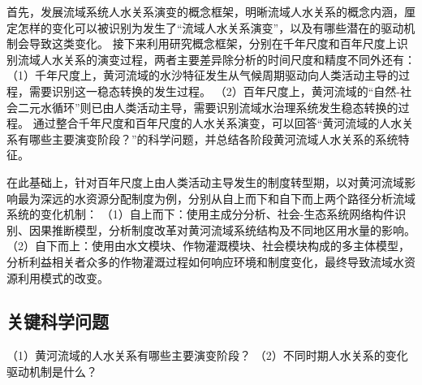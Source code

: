 首先，发展流域系统人水关系演变的概念框架，明晰流域人水关系的概念内涵，厘定怎样的变化可以被识别为发生了“流域人水关系演变”，以及有哪些潜在的驱动机制会导致这类变化。
接下来利用研究概念框架，分别在千年尺度和百年尺度上识别流域人水关系的演变过程，两者主要差异除分析的时间尺度和精度不同外还有：
（1）千年尺度上，黄河流域的水沙特征发生从气候周期驱动向人类活动主导的过程，需要识别这一稳态转换的发生过程。
（2）百年尺度上，黄河流域的“自然-社会二元水循环”则已由人类活动主导，需要识别流域水治理系统发生稳态转换的过程。
通过整合千年尺度和百年尺度的人水关系演变，可以回答“黄河流域的人水关系有哪些主要演变阶段？”的科学问题，并总结各阶段黄河流域人水关系的系统特征。

在此基础上，针对百年尺度上由人类活动主导发生的制度转型期，以对黄河流域影响最为深远的水资源分配制度为例，分别从自上而下和自下而上两个路径分析流域系统的变化机制：
（1）自上而下：使用主成分分析、社会-生态系统网络构件识别、因果推断模型，分析制度改革对黄河流域系统结构及不同地区用水量的影响。
（2）自下而上：使用由水文模块、作物灌溉模块、社会模块构成的多主体模型，分析利益相关者众多的作物灌溉过程如何响应环境和制度变化，最终导致流域水资源利用模式的改变。

\subsection{关键科学问题}

（1）黄河流域的人水关系有哪些主要演变阶段？
（2）不同时期人水关系的变化驱动机制是什么？
